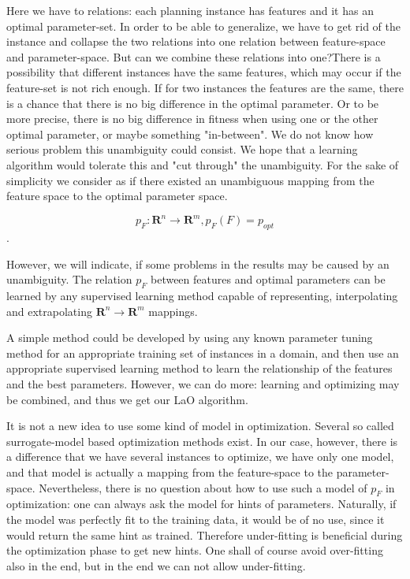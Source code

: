 \documentclass{acm_proc_article-sp}
\begin{document}
Here we have to relations: each planning instance has features and it has an optimal parameter-set. In order to be able to generalize, we have to get rid of the instance and collapse the two relations into one relation between feature-space and parameter-space. But can we combine these relations into one?There is a possibility that different instances have the same features, which may occur if the feature-set is not rich enough. If for two instances the features are the same, there is a chance that there is no big difference in the optimal parameter. Or to be more precise, there is no big difference in fitness when using one or the other optimal parameter, or maybe something "in-between". We do not know how serious problem this unambiguity could consist. We hope that a learning algorithm would tolerate this and "cut through" the unambiguity. For the sake of simplicity we consider as if there existed an unambiguous mapping from the feature space to the optimal parameter space. 

\begin{equation} p_F: \mathbf{R}^n \to \mathbf{R}^m, p_F(F)=p_{opt} \end{equation}.	

However, we will indicate, if some problems in the results may be caused by an unambiguity. The relation \begin{math} p_F \end{math} between features and optimal parameters can be learned by any supervised learning method capable of representing, interpolating and extrapolating  \begin{math}\mathbf{R}^n\to \mathbf{R}^m \end{math} mappings. 

A simple method could be developed by using any known parameter tuning method for an appropriate training set of instances in a domain, and then use an appropriate supervised learning method to learn the relationship of the features and the best parameters. However, we can do more: learning and optimizing may be combined, and thus we get our LaO algorithm.

It is not a new idea to use some kind of model in optimization. Several so called surrogate-model based optimization methods exist. In our case, however, there is a difference that we have several instances to optimize, we have only one model, and that model is actually a mapping from the feature-space to the parameter-space. Nevertheless, there is no question about how to use such a model of \begin{math}p_F\end{math} in optimization: one can always ask the model for hints of parameters. Naturally, if the model was perfectly fit to the training data, it would be of no use, since it would return the same hint as trained. Therefore under-fitting is beneficial during the optimization phase to get new hints. One shall of course avoid over-fitting also in the end, but in the end we can not allow under-fitting.
\end{document}
